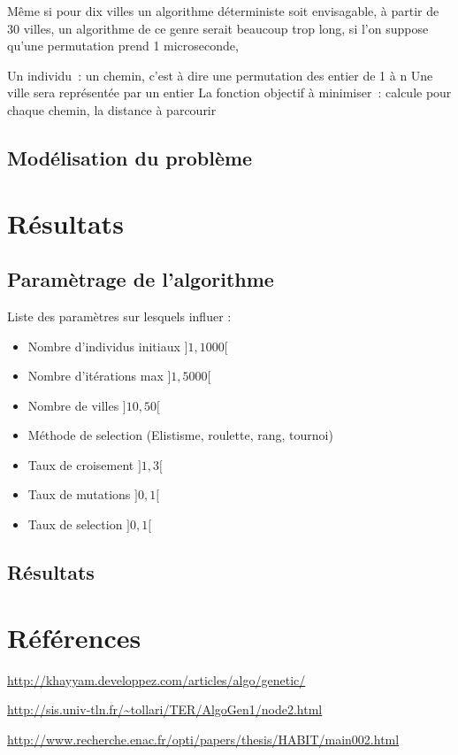 \documentclass{article}
\begin{document}
    Même si pour dix villes un algorithme déterministe soit envisagable, à partir de 30 villes, un algorithme de ce genre serait beaucoup trop long, si l'on suppose qu'une permutation prend 1 microseconde,
	
	Un individu : un chemin, c'est à dire une permutation des entier de 1 à n
	Une ville sera représentée par un entier
	La fonction objectif à minimiser : calcule pour chaque chemin, la distance à parcourir

	\subsection{Modélisation du problème}

\section{Résultats}
	\subsection{Paramètrage de l'algorithme}

	Liste des paramètres sur lesquels influer :
	\begin{itemize}
	\item Nombre d'individus initiaux $]1,1000[$
	\item Nombre d'itérations max $]1,5000[$
	\item Nombre de villes $]10,50[$
	\item Méthode de selection (Elistisme, roulette, rang, tournoi)
	\item Taux de croisement $]1,3[$
	\item Taux de mutations $]0,1[$
	\item Taux de selection $]0,1[$
	\end{itemize}

	\subsection{Résultats}

\section{Références}
	\url{http://khayyam.developpez.com/articles/algo/genetic/}

	\url{http://sis.univ-tln.fr/~tollari/TER/AlgoGen1/node2.html}

	\url{http://www.recherche.enac.fr/opti/papers/thesis/HABIT/main002.html}
\end{document}
